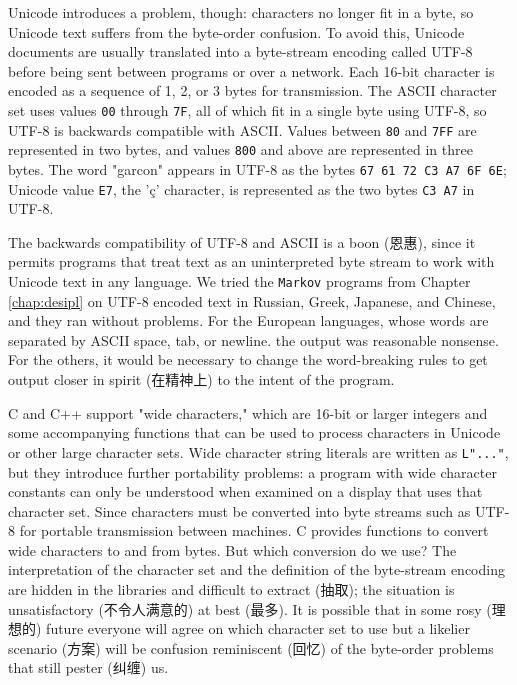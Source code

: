 Unicode introduces a problem, though: characters no longer fit in a byte,
so Unicode text suffers from the byte-order confusion. To avoid this,
Unicode documents are usually translated into a byte-stream encoding
called UTF-8 before being sent between programs or over a network. Each
16-bit character is encoded as a sequence of 1, 2, or 3 bytes for
transmission. The ASCII character set uses values \verb'00' through
\verb'7F', all of which fit in a single byte using UTF-8, so UTF-8 is
backwards compatible with ASCII. Values between \verb'80' and \verb'7FF'
are represented in two bytes, and values \verb'800' and above are
represented in three bytes. The word "garcon" appears in UTF-8 as the bytes
\verb'67 61 72 C3 A7 6F 6E'; Unicode value \verb'E7', the '\c{c}'
character, is represented as the two bytes \verb'C3 A7' in UTF-8.

The backwards compatibility of UTF-8 and ASCII is a boon (恩惠), since it
permits programs that treat text as an uninterpreted byte stream to work
with Unicode text in any language. We tried the \verb'Markov' programs from
Chapter \ref{chap:desipl} on UTF-8 encoded text in Russian, Greek,
Japanese, and Chinese, and they ran without problems. For the European
languages, whose words are separated by ASCII space, tab, or newline.  the
output was reasonable nonsense. For the others, it would be necessary to
change the word-breaking rules to get output closer in spirit (在精神上) to
the intent of the program.

C and C++ support "wide characters," which are 16-bit or larger integers
and some accompanying functions that can be used to process characters in
Unicode or other large character sets. Wide character string literals are
written as \verb'L"..."', but they introduce further portability problems:
a program with wide character constants can only be understood when
examined on a display that uses that character set.  Since characters must
be converted into byte streams such as UTF-8 for portable transmission
between machines. C provides functions to convert wide characters to and
from bytes. But which conversion do we use? The interpretation of the
character set and the definition of the byte-stream encoding are hidden in
the libraries and difficult to extract (抽取); the situation is
unsatisfactory (不令人满意的) at best (最多). It is possible that in some
rosy (理想的) future everyone will agree on which character set to use but
a likelier scenario (方案) will be confusion reminiscent (回忆) of the
byte-order problems that still pester (纠缠) us.

